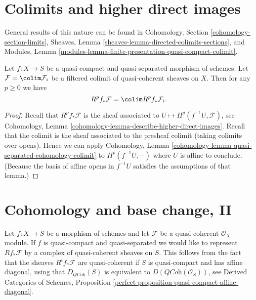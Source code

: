 





\section{Colimits and higher direct images}
\label{section-colimits}

\noindent
General results of this nature can be found in
Cohomology, Section \ref{cohomology-section-limits},
Sheaves, Lemma \ref{sheaves-lemma-directed-colimits-sections}, and
Modules, Lemma \ref{modules-lemma-finite-presentation-quasi-compact-colimit}.

\begin{lemma}
\label{lemma-colimit-cohomology}
Let $f : X \to S$ be a quasi-compact and quasi-separated morphism of schemes.
Let $\mathcal{F} = \colim \mathcal{F}_i$ be a filtered colimit
of quasi-coherent sheaves on $X$.
Then for any $p \geq 0$ we have
$$
R^pf_*\mathcal{F} = \colim R^pf_*\mathcal{F}_i.
$$
\end{lemma}

\begin{proof}
Recall that $R^pf_*\mathcal{F}$ is the sheaf associated to
$U \mapsto H^p(f^{-1}U, \mathcal{F})$, see
Cohomology, Lemma \ref{cohomology-lemma-describe-higher-direct-images}.
Recall that the colimit is the sheaf associated to the presheaf colimit
(taking colimits over opens). Hence we can apply
Cohomology, Lemma \ref{cohomology-lemma-quasi-separated-cohomology-colimit}
to $H^p(f^{-1}U, -)$ where $U$ is affine to conclude. (Because the
basis of affine opens in $f^{-1}U$ satisfies the assumptions of that
lemma.)
\end{proof}










\section{Cohomology and base change, II}
\label{section-cohomology-and-base-change-derived}

\noindent
Let $f : X \to S$ be a morphism of schemes and let $\mathcal{F}$
be a quasi-coherent $\mathcal{O}_X$-module. If $f$ is quasi-compact
and quasi-separated we would like to represent $Rf_*\mathcal{F}$
by a complex of quasi-coherent sheaves on $S$. This follows
from the fact that the sheaves $R^if_*\mathcal{F}$ are quasi-coherent
if $S$ is quasi-compact and has affine diagonal,
using that $D_{\textit{QCoh}}(S)$ is equivalent to
$D(\textit{QCoh}(\mathcal{O}_S))$, see
Derived Categories of Schemes, Proposition
\ref{perfect-proposition-quasi-compact-affine-diagonal}.

